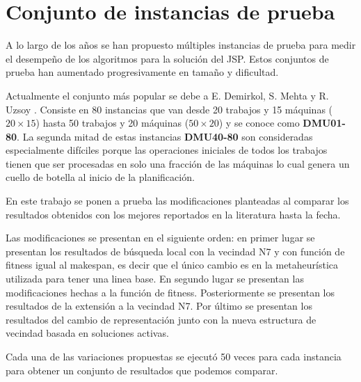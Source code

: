 \section{Conjunto de instancias de prueba}
A lo largo de los años se han propuesto múltiples instancias de prueba para medir el desempeño de los algoritmos para la solución del JSP. Estos conjuntos de prueba han aumentado progresivamente en tamaño y dificultad. 

Actualmente el conjunto más popular se debe a E. Demirkol, S. Mehta y R. Uzsoy \cite{demirkol1997computational}. Consiste en 80 instancias que van desde 20 trabajos y 15 máquinas ($20\times 15$) hasta 50 trabajos y 20 máquinas ($50\times 20$) y se conoce como \textbf{DMU01-80}. La segunda mitad de estas instancias \textbf{DMU40-80} son consideradas especialmente difíciles porque las operaciones iniciales de todos los trabajos tienen que ser procesadas en solo una fracción de las máquinas lo cual genera un cuello de botella al inicio de la planificación.

En este trabajo se ponen a prueba las modificaciones planteadas al comparar los resultados obtenidos con los mejores reportados en la literatura hasta la fecha.

Las modificaciones se presentan en el siguiente orden: en primer lugar se presentan los resultados de búsqueda local con la vecindad N7 y con función de fitness igual al makespan, es decir que el único cambio es en la metaheurística utilizada para tener una linea base. En segundo lugar se presentan las modificaciones hechas a la función de fitness. Posteriormente se presentan los resultados de la extensión a la vecindad N7. Por último se presentan los resultados del cambio de representación junto con la nueva estructura de vecindad basada en soluciones activas.

Cada una de las variaciones propuestas se ejecutó 50 veces para cada instancia para obtener un conjunto de resultados que podemos comparar.


